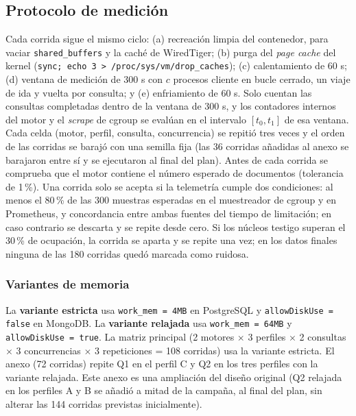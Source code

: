 \documentclass[12pt,letterpaper]{article}
\newcommand{\code}[1]{\texttt{#1}}
\newcommand{\Mongo}{MongoDB}
\newcommand{\PG}{PostgreSQL}
\begin{document}
\subsection{Protocolo de medición}
Cada corrida sigue el mismo ciclo: (a) recreación limpia del contenedor, para vaciar \code{shared\_buffers} y la caché de WiredTiger;
(b) purga del \textit{page cache} del kernel (\code{sync; echo 3 > /proc/sys/vm/drop\_caches}); (c) calentamiento de 60 s;
(d) ventana de medición de 300 s con $c$ procesos cliente en bucle cerrado, un viaje de ida y vuelta por consulta; y
(e) enfriamiento de 60 s. Solo cuentan las consultas completadas dentro de la ventana de 300 s, y los contadores
internos del motor y el \textit{scrape} de cgroup se evalúan en el intervalo $[t_0,t_1]$ de esa ventana. Cada celda
(motor, perfil, consulta, concurrencia) se repitió tres veces y el orden de las corridas se barajó con una semilla fija (las 36 corridas añadidas
al anexo se barajaron entre sí y se ejecutaron al final del plan). Antes de cada corrida se comprueba que el motor contiene el número esperado de documentos (tolerancia de 1\,\%).
Una corrida solo se acepta si la telemetría cumple dos condiciones: al menos el 80\,\% de las 300 muestras esperadas en el muestreador de
cgroup y en Prometheus, y concordancia entre ambas fuentes del tiempo de limitación; en caso contrario se descarta y se repite desde cero.
Si los núcleos testigo superan el 30\,\% de ocupación, la corrida se aparta y se repite una vez; en los datos finales ninguna de las 180 corridas quedó marcada como ruidosa.

\subsubsection{Variantes de memoria}
La \textbf{variante estricta} usa \code{work\_mem = 4MB} en \PG{} y \code{allowDiskUse = false} en \Mongo{}. La
\textbf{variante relajada} usa \code{work\_mem = 64MB} y \code{allowDiskUse = true}. La matriz principal
(2 motores $\times$ 3 perfiles $\times$ 2 consultas $\times$ 3 concurrencias $\times$ 3 repeticiones = 108 corridas) usa la
variante estricta. El anexo (72 corridas) repite Q1 en el perfil C y Q2 en los tres perfiles con la variante relajada.
Este anexo es una ampliación del diseño original (Q2 relajada en los perfiles A y B se añadió a mitad de la campaña, al final del plan,
sin alterar las 144 corridas previstas inicialmente).
\end{document}
